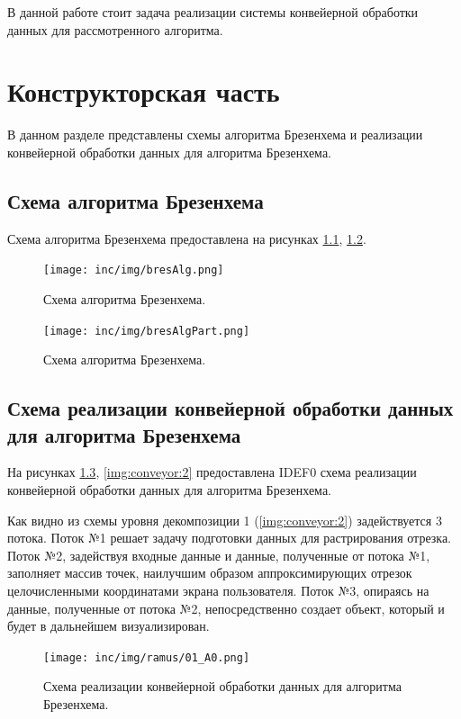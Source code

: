 \documentclass[12pt]{report}
\begin{document}
В данной работе стоит задача реализации системы конвейерной обработки данных для рассмотренного алгоритма.

\chapter{Конструкторская часть}
В данном разделе представлены схемы алгоритма Брезенхема и реализации конвейерной обработки данных для алгоритма Брезенхема.
\section{Схема алгоритма Брезенхема}
Схема алгоритма Брезенхема предоставлена на рисунках \ref{img:bresAlg}, \ref{img:bresAlgPart}.

\begin{figure}
\begin{center}
\texttt{[image: inc/img/bresAlg.png]}
\captionsetup{justification=centering}
	\caption{Схема алгоритма Брезенхема.}
	\label{img:bresAlg}	
\end{center}
\end{figure}

\begin{figure}
\begin{center}
\texttt{[image: inc/img/bresAlgPart.png]}
\captionsetup{justification=centering}
	\caption{Схема алгоритма Брезенхема.}
	\label{img:bresAlgPart}	
\end{center}
\end{figure}

\newpage

\section{Схема реализации конвейерной обработки данных для алгоритма Брезенхема}
На рисунках \ref{img:conveyor}, \ref{img:conveyor:2} предоставлена IDEF0 схема реализации конвейерной обработки данных для алгоритма Брезенхема.

Как видно из схемы уровня декомпозиции 1 (\ref{img:conveyor:2}) задействуется 3 потока. Поток №1 решает задачу подготовки данных для растрирования отрезка. Поток №2, задействуя входные данные и данные, полученные от потока №1, заполняет массив точек, наилучшим образом аппроксимирующих отрезок целочисленными координатами экрана пользователя. Поток №3, опираясь на данные, полученные от потока №2, непосредственно создает объект, который и будет в дальнейшем визуализирован.

\begin{figure}[ht]
\begin{center}
\texttt{[image: inc/img/ramus/01\_A0.png]}
\captionsetup{justification=centering}
	\caption{Схема реализации конвейерной обработки данных для алгоритма Брезенхема.}
	\label{img:conveyor}	
\end{center}
\end{figure}
\end{document}
